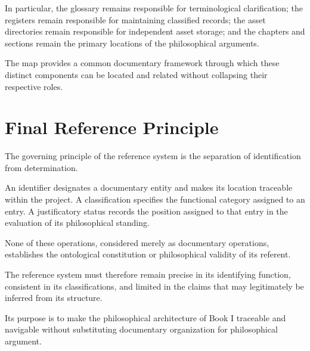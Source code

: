 In particular, the glossary remains responsible for
terminological clarification; the registers remain
responsible for maintaining classified records; the
asset directories remain responsible for independent
asset storage; and the chapters and sections remain
the primary locations of the philosophical arguments.

The map provides a common documentary framework through
which these distinct components can be located and
related without collapsing their respective roles.



\section*{Final Reference Principle}

The governing principle of the reference system is
the separation of identification from determination.

An identifier designates a documentary entity and
makes its location traceable within the project.
A classification specifies the functional category
assigned to an entry. A justificatory status records
the position assigned to that entry in the evaluation
of its philosophical standing.

None of these operations, considered merely as
documentary operations, establishes the ontological
constitution or philosophical validity of its referent.

The reference system must therefore remain precise
in its identifying function, consistent in its
classifications, and limited in the claims that
may legitimately be inferred from its structure.

Its purpose is to make the philosophical architecture
of Book I traceable and navigable without substituting
documentary organization for philosophical argument.


